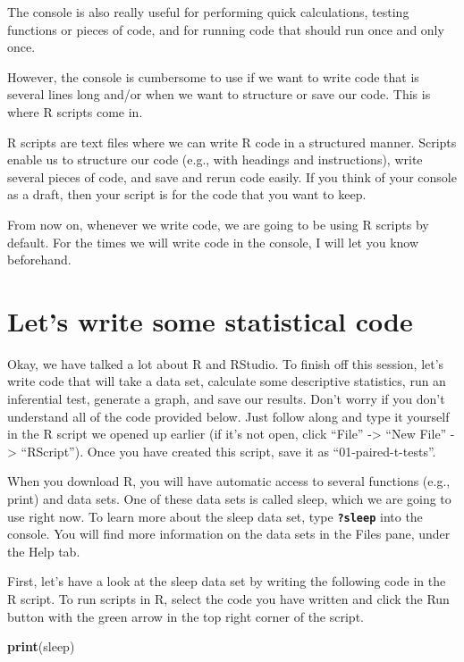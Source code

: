 \documentclass[
]{book}
\newenvironment{Shaded}{\begin{snugshade}}{\end{snugshade}}
\newcommand{\FunctionTok}[1]{\textcolor[rgb]{0.13,0.29,0.53}{\textbf{#1}}}
\newcommand{\NormalTok}[1]{#1}
\begin{document}
The console is also really useful for performing quick calculations, testing functions or pieces of code, and for running code that should run once and only once.

However, the console is cumbersome to use if we want to write code that is several lines long and/or when we want to structure or save our code. This is where R scripts come in.

R scripts are text files where we can write R code in a structured manner. Scripts enable us to structure our code (e.g., with headings and instructions), write several pieces of code, and save and rerun code easily. If you think of your console as a draft, then your script is for the code that you want to keep.

From now on, whenever we write code, we are going to be using R scripts by default. For the times we will write code in the console, I will let you know beforehand.

\hypertarget{lets-write-some-statistical-code}{%
\section{Let's write some statistical code}\label{lets-write-some-statistical-code}}

Okay, we have talked a lot about R and RStudio. To finish off this session, let's write code that will take a data set, calculate some descriptive statistics, run an inferential test, generate a graph, and save our results. Don't worry if you don't understand all of the code provided below. Just follow along and type it yourself in the R script we opened up earlier (if it's not open, click ``File'' -\textgreater{} ``New File'' -\textgreater{} ``RScript''). Once you have created this script, save it as ``01-paired-t-tests''.

When you download R, you will have automatic access to several functions (e.g., print) and data sets. One of these data sets is called sleep, which we are going to use right now. To learn more about the sleep data set, type \textbf{\texttt{?sleep}} into the console. You will find more information on the data sets in the Files pane, under the Help tab.

First, let's have a look at the sleep data set by writing the following code in the R script. To run scripts in R, select the code you have written and click the Run button with the green arrow in the top right corner of the script.

\begin{Shaded}
\begin{Highlighting}[]
\FunctionTok{print}\NormalTok{(sleep) }
\end{Highlighting}
\end{Shaded}
\end{document}
